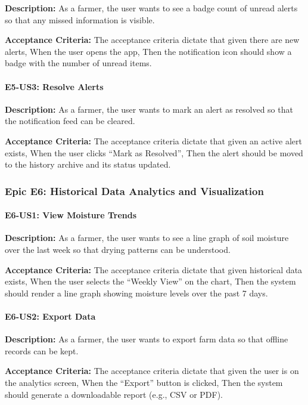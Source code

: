 \textbf{Description:} As a farmer, the user wants to see a badge 
count of unread alerts so that any missed information is visible.

\textbf{Acceptance Criteria:} The acceptance criteria dictate that given there are new alerts, When the user opens the app, Then the notification icon should show a badge with the number of unread items.


\paragraph{E5-US3: Resolve Alerts}

\textbf{Description:} As a farmer, the user wants to mark an alert 
as resolved so that the notification feed can be cleared.

\textbf{Acceptance Criteria:} The acceptance criteria dictate that given an active alert exists, When the user clicks ``Mark as Resolved'', Then the alert should be moved to the history archive and its status updated.


\subsubsection{Epic E6: Historical Data Analytics and Visualization}

\paragraph{E6-US1: View Moisture Trends}

\textbf{Description:} As a farmer, the user wants to see a line 
graph of soil moisture over the last week so that drying patterns 
can be understood.

\textbf{Acceptance Criteria:} The acceptance criteria dictate that given historical data exists, When the user selects the ``Weekly View'' on the chart, Then the system should render a line graph showing moisture levels over the past 7 days.


\paragraph{E6-US2: Export Data}

\textbf{Description:} As a farmer, the user wants to export farm 
data so that offline records can be kept.

\textbf{Acceptance Criteria:} The acceptance criteria dictate that given the user is on the analytics screen, When the ``Export'' button is clicked, Then the system should generate a downloadable report (e.g., CSV or PDF).


